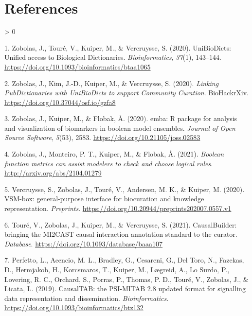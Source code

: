 \documentclass[
  12pt,
]{book}
\newlength{\cslhangindent}
\newenvironment{CSLReferences}[2] %
 {%
  \setlength{\parindent}{0pt}
  \ifodd #1 \everypar{\setlength{\hangindent}{\cslhangindent}}\ignorespaces\fi
  \ifnum #2 > 0
  \setlength{\parskip}{#2\baselineskip}
  \fi
 }%
 {}
\begin{document}
\hypertarget{references}{%
\chapter*{References}\label{references}}

\hypertarget{refs}{}
\begin{CSLReferences}{1}{0}
\leavevmode\hypertarget{ref-UBDs}{}%
1. Zobolas, J., Touré, V., Kuiper, M., \& Vercruysse, S. (2020). {UniBioDicts: Unified access to Biological Dictionaries}. \emph{Bioinformatics}, \emph{37}(1), 143--144. \url{https://doi.org/10.1093/bioinformatics/btaa1065}

\leavevmode\hypertarget{ref-Zobolas2020-pubdict}{}%
2. Zobolas, J., Kim, J.-D., Kuiper, M., \& Vercruysse, S. (2020). \emph{{Linking PubDictionaries with UniBioDicts to support Community Curation}}. BioHackrXiv. \url{https://doi.org/10.37044/osf.io/gzfa8}

\leavevmode\hypertarget{ref-Zobolas2020}{}%
3. Zobolas, J., Kuiper, M., \& Flobak, Å. (2020). {emba: R package for analysis and visualization of biomarkers in boolean model ensembles}. \emph{Journal of Open Source Software}, \emph{5}(53), 2583. \url{https://doi.org/10.21105/joss.02583}

\leavevmode\hypertarget{ref-Zobolas2021-bias}{}%
4. Zobolas, J., Monteiro, P. T., Kuiper, M., \& Flobak, Å. (2021). \emph{{Boolean function metrics can assist modelers to check and choose logical rules}}. \url{http://arxiv.org/abs/2104.01279}

\leavevmode\hypertarget{ref-vsm-box}{}%
5. Vercruysse, S., Zobolas, J., Touré, V., Andersen, M. K., \& Kuiper, M. (2020). {VSM-box: general-purpose interface for biocuration and knowledge representation}. \emph{Preprints}. \url{https://doi.org/10.20944/preprints202007.0557.v1}

\leavevmode\hypertarget{ref-Toure2021}{}%
6. Touré, V., Zobolas, J., Kuiper, M., \& Vercruysse, S. (2021). {CausalBuilder: bringing the MI2CAST causal interaction annotation standard to the curator}. \emph{Database}. \url{https://doi.org/10.1093/database/baaa107}

\leavevmode\hypertarget{ref-Perfetto2019}{}%
7. Perfetto, L., Acencio, M. L., Bradley, G., Cesareni, G., Del Toro, N., Fazekas, D., Hermjakob, H., Korcsmaros, T., Kuiper, M., Lægreid, A., Lo Surdo, P., Lovering, R. C., Orchard, S., Porras, P., Thomas, P. D., Touré, V., Zobolas, J., \& Licata, L. (2019). {CausalTAB: the PSI-MITAB 2.8 updated format for signalling data representation and dissemination}. \emph{Bioinformatics}. \url{https://doi.org/10.1093/bioinformatics/btz132}


\end{CSLReferences}
\end{document}
